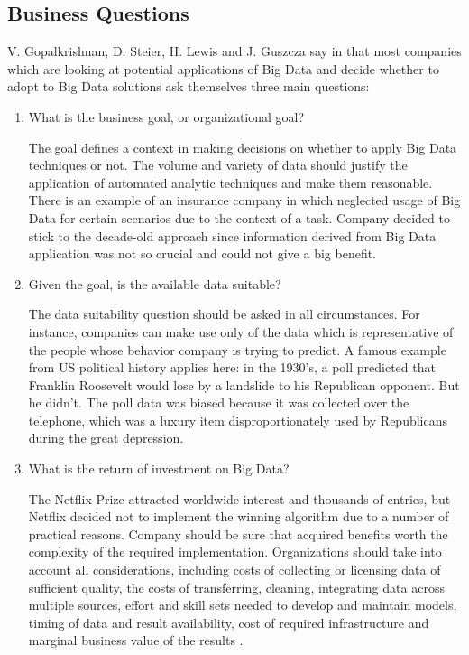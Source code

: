 \documentclass[runningheads]{llncs}
\begin{document}
\subsection{Business Questions}
V. Gopalkrishnan, D. Steier, H. Lewis and J. Guszcza say in \cite{Gopalkrishnan} that most companies which are looking at potential applications of Big Data and decide whether to adopt to Big Data solutions ask themselves three main questions:
\begin{enumerate}
\item What is the business goal, or organizational goal? 

The goal defines a context in making decisions on whether to apply Big Data techniques or not. The volume and variety of data should justify the application of automated analytic techniques and make them reasonable. There is an example of an insurance company in \cite{Gopalkrishnan} which neglected usage of Big Data for certain scenarios due to the context of a task. Company decided to stick to the decade-old approach since information derived from Big Data application was not so crucial and could not give a big benefit. 
\item Given the goal, is the available data suitable? 

The data suitability question should be asked in all circumstances. For instance, companies can make use only of the data which is representative of the people whose behavior company is trying to predict. A famous example from US political history applies here: in the 1930's, a poll predicted that Franklin Roosevelt would lose by a landslide to his Republican opponent. But he didn't. The poll data was biased because it was collected over the telephone, which was a luxury item disproportionately used by Republicans during the great depression.
\item What is the return of investment on Big Data? 

The Netflix Prize attracted worldwide interest and thousands of entries, but Netflix decided not to implement the winning algorithm \cite{NETFLIX} due to a number of practical reasons. Company should be sure that acquired benefits worth the complexity of the required implementation. Organizations should take into account all considerations, including costs of collecting or licensing data of sufficient quality, the costs of transferring, cleaning, integrating data across multiple sources, effort and skill sets needed to develop and maintain models, timing of data and result availability, cost of required infrastructure and marginal business value of the results \cite{Gopalkrishnan}.
\end{enumerate}



\end{document}
